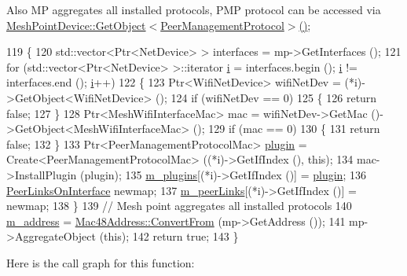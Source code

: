 Also MP aggregates all installed protocols, P\+MP protocol can be accessed via \hyperlink{classns3_1_1Object_a13e18c00017096c8381eb651d5bd0783}{Mesh\+Point\+Device\+::\+Get\+Object$<$\+Peer\+Management\+Protocol$>$()}; 
\begin{DoxyCode}
119 \{
120   std::vector<Ptr<NetDevice> > interfaces = mp->GetInterfaces ();
121   \textcolor{keywordflow}{for} (std::vector<Ptr<NetDevice> >::iterator \hyperlink{bernuolliDistribution_8m_a6f6ccfcf58b31cb6412107d9d5281426}{i} = interfaces.begin (); \hyperlink{bernuolliDistribution_8m_a6f6ccfcf58b31cb6412107d9d5281426}{i} != interfaces.end (); 
      \hyperlink{bernuolliDistribution_8m_a6f6ccfcf58b31cb6412107d9d5281426}{i}++)
122     \{
123       Ptr<WifiNetDevice> wifiNetDev = (*i)->GetObject<WifiNetDevice> ();
124       \textcolor{keywordflow}{if} (wifiNetDev == 0)
125         \{
126           \textcolor{keywordflow}{return} \textcolor{keyword}{false};
127         \}
128       Ptr<MeshWifiInterfaceMac> mac = wifiNetDev->GetMac ()->GetObject<MeshWifiInterfaceMac> ();
129       \textcolor{keywordflow}{if} (mac == 0)
130         \{
131           \textcolor{keywordflow}{return} \textcolor{keyword}{false};
132         \}
133       Ptr<PeerManagementProtocolMac> \hyperlink{visualizer-ideas_8txt_a82212ee380150b652f4dad598413d06f}{plugin} = Create<PeerManagementProtocolMac> ((*i)->GetIfIndex (),
       \textcolor{keyword}{this});
134       mac->InstallPlugin (plugin);
135       \hyperlink{classns3_1_1dot11s_1_1PeerManagementProtocol_a9000d20f6feb3db279a020b237f49d64}{m\_plugins}[(*i)->GetIfIndex ()] = \hyperlink{visualizer-ideas_8txt_a82212ee380150b652f4dad598413d06f}{plugin};
136       \hyperlink{classns3_1_1dot11s_1_1PeerManagementProtocol_a97f867fbb15c916217ced3944d07e7a7}{PeerLinksOnInterface} newmap;
137       \hyperlink{classns3_1_1dot11s_1_1PeerManagementProtocol_aa4522af32720f04cfbb693adb2024c55}{m\_peerLinks}[(*i)->GetIfIndex ()] = newmap;
138     \}
139   \textcolor{comment}{// Mesh point aggregates all installed protocols}
140   \hyperlink{classns3_1_1dot11s_1_1PeerManagementProtocol_abe566c402f630f4df83bdeb2e84a1343}{m\_address} = \hyperlink{classns3_1_1Mac48Address_a911ce13603a9ef837545a032b6523ae4}{Mac48Address::ConvertFrom} (mp->GetAddress ());
141   mp->AggregateObject (\textcolor{keyword}{this});
142   \textcolor{keywordflow}{return} \textcolor{keyword}{true};
143 \}
\end{DoxyCode}


Here is the call graph for this function\+:


